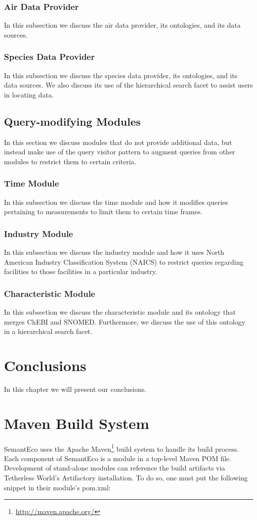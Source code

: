\documentclass[letterpaper]{report}
\begin{document}
\subsection{Air Data Provider}
In this subsection we discuss the air data provider, its ontologies, and its data sources.
\subsection{Species Data Provider}
In this subsection we discuss the species data provider, its ontologies, and its data sources. We also discuss its use of the hierarchical search facet to assist users in locating data.
\section{Query-modifying Modules}
In this section we discuss modules that do not provide additional data, but instead make use of the query visitor pattern to augment queries from other modules to restrict them to certain criteria.
\subsection{Time Module}
In this subsection we discuss the time module and how it modifies queries pertaining to measurements to limit them to certain time frames.
\subsection{Industry Module}
In this subsection we discuss the industry module and how it uses North American Industry Classification System (NAICS) to restrict queries regarding facilities to those facilities in a particular industry.
\subsection{Characteristic Module}
In this subsection we discuss the characteristic module and its ontology that merges ChEBI and SNOMED. Furthermore, we discuss the use of this ontology in a hierarchical search facet.
\chapter{Conclusions}
In this chapter we will present our conclusions.

\appendix
\chapter{Maven Build System}
SemantEco uses the Apache Maven\footnote{\url{http://maven.apache.org/}} build system to handle its build process. Each component of SemantEco is a module in a top-level Maven POM file. Development of stand-alone modules can reference the build artifacts via Tetherless World's Artifactory installation. To do so, one must put the following snippet in their module's pom.xml:
\end{document}
